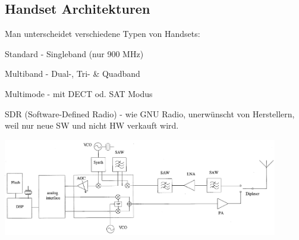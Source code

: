 \subsection{Handset Architekturen }
    \begin{minipage}{7cm} 
      Man unterscheidet verschiedene Typen von Handsets: 
      \begin{liste}
        \item Standard - Singleband (nur 900 MHz)
        \item Multiband - Dual-, Tri- \& Quadband
        \item Multimode - mit DECT od. SAT Modus
        \item SDR (Software-Defined Radio) - 
                wie GNU Radio, unerwünscht von Herstellern,
                weil nur neue SW und nicht HW verkauft wird.
      \end{liste}
    \end{minipage}
    \begin{minipage}{12cm}    
        \includegraphics[width=12cm]{./bilder/systems-handset.png}
    \end{minipage}

